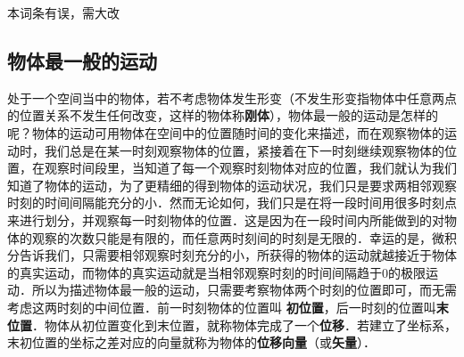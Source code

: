 
\begin{issues}
本词条有误，需大改
\end{issues}
\subsection{物体最一般的运动}
处于一个空间当中的物体，若不考虑物体发生形变（不发生形变指物体中任意两点的位置关系不发生任何改变，这样的物体称\textbf{刚体}），物体最一般的运动是怎样的呢？物体的运动可用物体在空间中的位置随时间的变化来描述，而在观察物体的运动时，我们总是在某一时刻观察物体的位置，紧接着在下一时刻继续观察物体的位置，在观察时间段里，当知道了每一个观察时刻物体对应的位置，我们就认为我们知道了物体的运动，为了更精细的得到物体的运动状况，我们只是要求两相邻观察时刻的时间间隔能充分的小．然而无论如何，我们只是在将一段时间用很多时刻点来进行划分，并观察每一时刻物体的位置．这是因为在一段时间内所能做到的对物体的观察的次数只能是有限的，而任意两时刻间的时刻是无限的．幸运的是，微积分告诉我们，只需要相邻观察时刻充分的小，所获得的物体的运动就越接近于物体的真实运动，而物体的真实运动就是当相邻观察时刻的时间间隔趋于0的极限运动．所以为描述物体最一般的运动，只需要考察物体两个时刻的位置即可，而无需考虑这两时刻的中间位置．前一时刻物体的位置叫 \textbf{初位置}，后一时刻的位置叫\textbf{末位置}．物体从初位置变化到末位置，就称物体完成了一个\textbf{位移}．若建立了坐标系，末初位置的坐标之差对应的向量就称为物体的\textbf{位移向量}（或\textbf{矢量}）．
